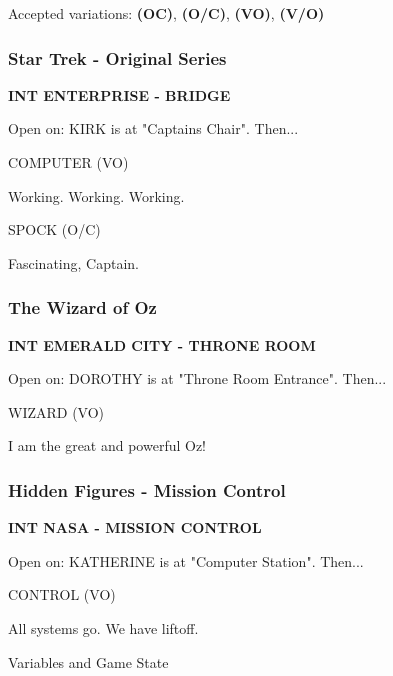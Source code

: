 \documentclass[11pt,letterpaper,oldstylefigures]{memoir}
\makeatletter
\newcommand{\slugline}[1]{\nobreak\textbf{\MakeUppercase{#1}}\par\nobreak\vspace{1\baselineskip}}
\newcommand{\speaker}[1]{\nobreak\hspace*{0.333\textwidth}\MakeUppercase{#1}\par\nobreak\vspace{0.5\baselineskip}}
\newcommand{\dialogue}[1]{\nobreak\hspace*{0.25\textwidth}\begin{minipage}{0.5\textwidth}#1\end{minipage}\par\vspace{1\baselineskip}}
\newcommand{\stagedir}[1]{#1\par\vspace{1\baselineskip}}
\newenvironment{FountainExample}
  {\begingroup
  \ttfamily\small
   \setlength{\parindent}{0pt}
  \setlength{\parskip}{0.5em}
  \allowdisplaybreaks
  \setlength{\displaywidowpenalty}{0}
  \setlength{\widowpenalty}{0}
  \setlength{\clubpenalty}{0}
  \setlength{\interlinepenalty}{0}
}
  {\endgroup}
\let\oldchapter\chapter
\def\chapter{%
  \@ifstar
    {\FountainScripting@starchapter}%
    {\@dblarg\FountainScripting@chapter}}
\def\FountainScripting@starchapter#1{\oldchapter*{#1}\chaptermark{#1}}
\def\FountainScripting@chapter[#1]#2{\oldchapter[#1]{#2}\chaptermark{#2}}
\newcommand{\sectionbreak}{\newpage}
\newcommand{\fountain}[1]{\textbf{#1}}
\makeatother
\begin{document}
Accepted variations: \fountain{(OC)}, \fountain{(O/C)}, \fountain{(VO)}, \fountain{(V/O)}

\subsubsection*{Star Trek - Original Series}
\label{ex:star-trek-original-series-2}

\begin{FountainExample}
\slugline{INT ENTERPRISE - BRIDGE}

\stagedir{Open on: KIRK is at "Captains Chair". Then...}

\speaker{COMPUTER (VO)}
\dialogue{Working. Working. Working.}

\speaker{SPOCK (O/C)}
\dialogue{Fascinating, Captain.}
\end{FountainExample}

\subsubsection*{The Wizard of Oz}
\label{ex:wizard-of-oz-novel-series-3}

\begin{FountainExample}
\slugline{INT EMERALD CITY - THRONE ROOM}

\stagedir{Open on: DOROTHY is at "Throne Room Entrance". Then...}

\speaker{WIZARD (VO)}
\dialogue{I am the great and powerful Oz!}
\end{FountainExample}

\subsubsection*{Hidden Figures - Mission Control}
\label{ex:hidden-figures-mission-control}

\begin{FountainExample}
\slugline{INT NASA - MISSION CONTROL}

\stagedir{Open on: KATHERINE is at "Computer Station". Then...}

\speaker{CONTROL (VO)}
\dialogue{All systems go. We have liftoff.}
\end{FountainExample}

\chapter{Variables and Game State}
\label{ch:variables}
\sectionbreak
\end{document}

